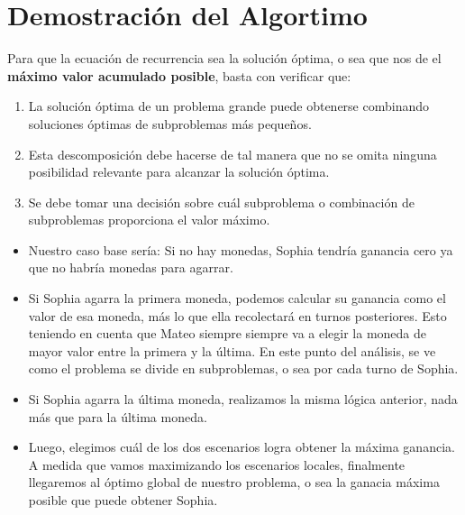 \section{Demostración del Algortimo}

Para que la ecuación de recurrencia sea la solución óptima, o sea que nos de el \textbf{máximo valor acumulado posible}, basta con verificar que:

\begin{enumerate}
    \item La solución óptima de un problema grande puede obtenerse combinando soluciones óptimas de subproblemas más pequeños.
    \item Esta descomposición debe hacerse de tal manera que no se omita ninguna posibilidad relevante para alcanzar la solución óptima.
    \item Se debe tomar una decisión sobre cuál subproblema o combinación de subproblemas proporciona el valor máximo.
\end{enumerate}



\begin{itemize}
    \item Nuestro caso base sería: Si no hay monedas, Sophia tendría ganancia cero ya que no habría monedas para agarrar.
    \item Si Sophia agarra la primera moneda, podemos calcular su ganancia como el valor de esa moneda, más lo que ella recolectará en turnos posteriores. Esto teniendo en cuenta
    que Mateo siempre siempre va a elegir la moneda de mayor valor entre la primera y la última. En este punto del análisis, se ve como el problema se divide en subproblemas, o sea por cada turno de Sophia.
    \item Si Sophia agarra la última moneda, realizamos la misma lógica anterior, nada más que para la última moneda.
    \item Luego, elegimos cuál de los dos escenarios logra obtener la máxima ganancia. A medida que vamos maximizando los escenarios locales, finalmente llegaremos al óptimo global de nuestro problema, o sea la ganacia máxima posible que puede obtener Sophia.
    \end{itemize}